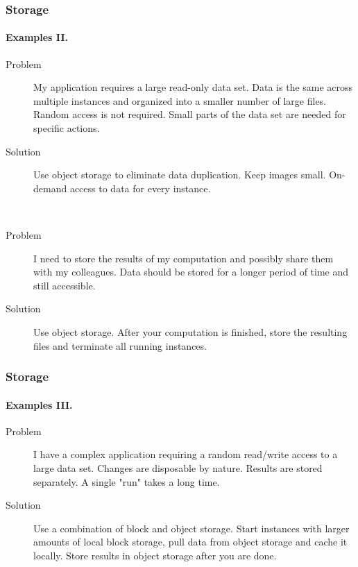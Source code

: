 \begin{frame}
  \frametitle{Storage}
  \framesubtitle{Examples II.}

  \begin{description}
    \item[Problem] My application requires a large read-only data set. Data is the same across multiple instances and
                   organized into a smaller number of large files. Random access is not required. Small parts of the data set
                   are needed for specific actions.
    \item[Solution] Use object storage to eliminate data duplication. Keep images small. On-demand access to data for every instance.
  \end{description}

  \hfill \\

  \begin{description}
    \item[Problem] I need to store the results of my computation and possibly share them with my colleagues. Data should be stored
                   for a longer period of time and still accessible.
    \item[Solution] Use object storage. After your computation is finished, store the resulting files and terminate all running instances.
  \end{description}
\end{frame}

\begin{frame}
  \frametitle{Storage}
  \framesubtitle{Examples III.}

  \begin{description}
    \item[Problem] I have a complex application requiring a random read/write access to a large data set. Changes are disposable
                   by nature. Results are stored separately. A single "run" takes a long time.
    \item[Solution] Use a combination of block and object storage. Start instances with larger amounts of local block storage,
                    pull data from object storage and cache it locally. Store results in object storage after you are done.
  \end{description}
\end{frame}

